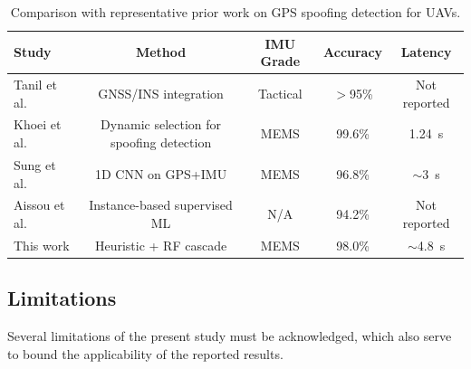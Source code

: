 \documentclass[electronics,article,accept,moreauthors]{Definitions/mdpi}
\begin{document}
\begin{table}[H]
\caption{Comparison with representative prior work on GPS spoofing detection for UAVs.\label{tab:comparison}}
\begin{tabularx}{\textwidth}{lCCCC}
\toprule
\textbf{Study} & \textbf{Method} & \textbf{IMU Grade} & \textbf{Accuracy} & \textbf{Latency} \\
\midrule
Tanil et al.~\cite{tanil2018} & GNSS/INS integration  & Tactical   & $>$95\%   & Not reported \\
Khoei et al.~\cite{khoei2022dynamic} & Dynamic selection for spoofing detection & MEMS & 99.6\% & 1.24~s \\
Sung et al.~\cite{sung2022} & 1D CNN on GPS+IMU & MEMS & 96.8\% & $\sim$3~s \\
Aissou et al.~\cite{aissou2022} & Instance-based supervised ML & N/A & 94.2\% & Not reported \\
This work & Heuristic + RF cascade & MEMS & 98.0\% & $\sim$4.8~s \\
\bottomrule
\end{tabularx}
\end{table}

\subsection{Limitations}

Several limitations of the present study must be acknowledged, which also serve to bound the applicability of the reported results.
\end{document}
